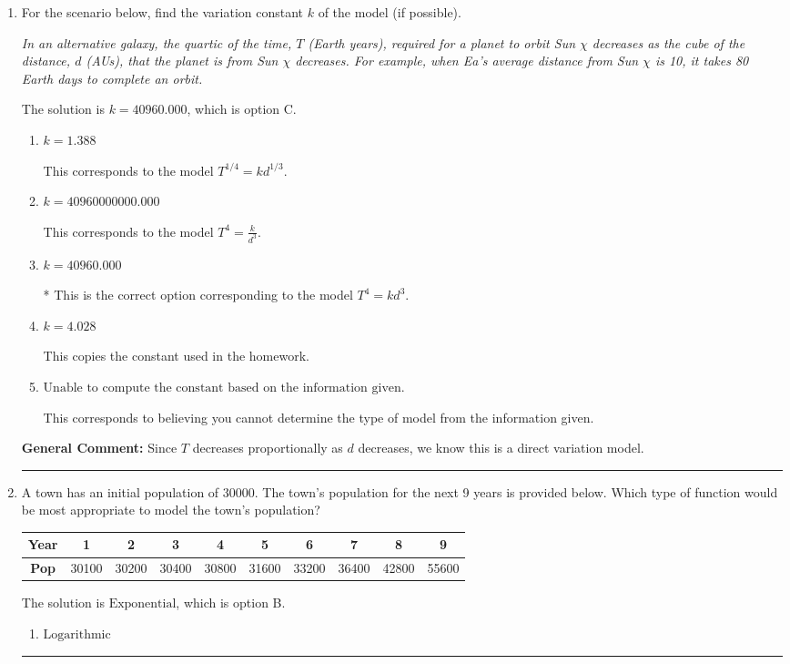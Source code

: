 \documentclass{extbook}[14pt]
\newcommand{\litem}[1]{\item #1

\rule{\textwidth}{0.4pt}}
\begin{document}
\begin{enumerate}\litem{
For the scenario below, find the variation constant $k$ of the model (if possible).

\begin{center}
    \textit{ In an alternative galaxy, the quartic of the time, $T$ (Earth years), required for a planet to orbit Sun $\chi$ decreases as the cube of the distance, $d$ (AUs), that the planet is from Sun $\chi$ decreases. For example, when Ea's average distance from Sun $\chi$ is 10, it takes 80 Earth days to complete an orbit. }
\end{center}
The solution is \( k = 40960.000 \), which is option C.\begin{enumerate}[label=\Alph*.]
\item \( k = 1.388 \)

This corresponds to the model $T^{1/4} = k d^{1/3}$.
\item \( k = 40960000000.000 \)

This corresponds to the model $T^{4} = \frac{k}{d^{3}}$.
\item \( k = 40960.000 \)

* This is the correct option corresponding to the model $T^{4} = k d^{3}$.
\item \( k = 4.028 \)

This copies the constant used in the homework.
\item \( \text{Unable to compute the constant based on the information given.} \)

This corresponds to believing you cannot determine the type of model from the information given.
\end{enumerate}

\textbf{General Comment:} Since $T$ decreases proportionally as $d$ decreases, we know this is a direct variation model.
}
\litem{
A town has an initial population of 30000. The town's population for the next 9 years is provided below. Which type of function would be most appropriate to model the town's population?


\begin{tabular}{c|c|c|c|c|c|c|c|c|c}
\textbf{Year} &1 &2 &3 &4 &5 &6 &7 &8 &9\tabularnewline \hline
\textbf{Pop} &30100 &30200 &30400 &30800 &31600 &33200 &36400 &42800 &55600\end{tabular}The solution is \( \text{Exponential} \), which is option B.\begin{enumerate}[label=\Alph*.]
\item \( \text{Logarithmic} \)


\end{enumerate}}
\end{enumerate}
\end{document}
